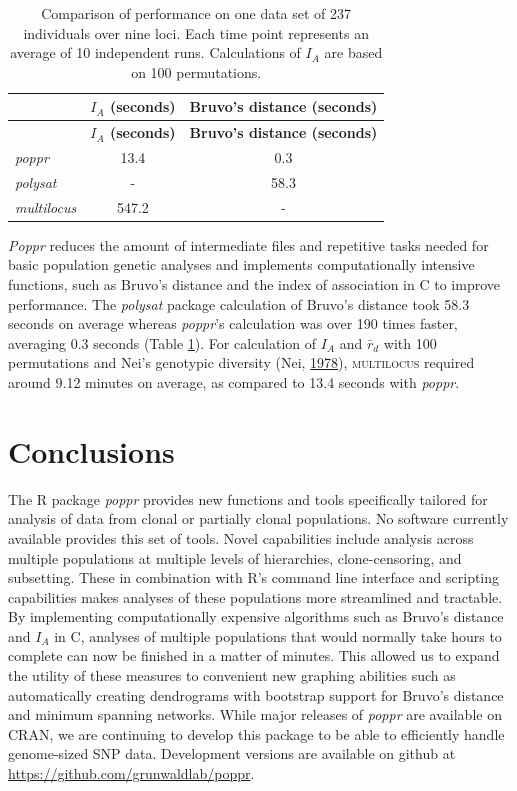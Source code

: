\documentclass[double,12pt]{beavtex}
\begin{document}
  \begin{longtable}[]{@{}lcc@{}}
  \caption{\label{tab:poppr6} Comparison of performance on one data set of 237
  individuals over nine loci. Each time point represents an average of 10
  independent runs. Calculations of \(I_A\) are based on 100
  permutations.}\tabularnewline
  \toprule
  & \textbf{\(I_A\) (seconds)} & \textbf{Bruvo's distance
  (seconds)}\tabularnewline
  \midrule
  \endfirsthead
  \toprule
  & \textbf{\(I_A\) (seconds)} & \textbf{Bruvo's distance
  (seconds)}\tabularnewline
  \midrule
  \endhead
  \emph{poppr} & 13.4 & 0.3\tabularnewline
  \emph{polysat} & - & 58.3\tabularnewline
  \emph{multilocus} & 547.2 & -\tabularnewline
  \bottomrule
  \end{longtable}
  
  \emph{Poppr} reduces the amount of intermediate files and repetitive
  tasks needed for basic population genetic analyses and implements
  computationally intensive functions, such as Bruvo's distance and the
  index of association in C to improve performance. The \emph{polysat}
  package calculation of Bruvo's distance took 58.3 seconds on average
  whereas \emph{poppr}'s calculation was over 190 times faster, averaging
  0.3 seconds (Table \ref{tab:poppr6}). For calculation of \(I_A\) and
  \(\bar{r}_d\) with 100 permutations and Nei's genotypic diversity (Nei,
  \protect\hyperlink{ref-Nei:1978}{1978}), \textsc{multilocus} required
  around 9.12 minutes on average, as compared to 13.4 seconds with
  \emph{poppr}.
  
  \section{Conclusions}\label{conclusions}
  
  The R package \emph{poppr} provides new functions and tools specifically
  tailored for analysis of data from clonal or partially clonal
  populations. No software currently available provides this set of tools.
  Novel capabilities include analysis across multiple populations at
  multiple levels of hierarchies, clone-censoring, and subsetting. These
  in combination with R's command line interface and scripting
  capabilities makes analyses of these populations more streamlined and
  tractable. By implementing computationally expensive algorithms such as
  Bruvo's distance and \(I_A\) in C, analyses of multiple populations that
  would normally take hours to complete can now be finished in a matter of
  minutes. This allowed us to expand the utility of these measures to
  convenient new graphing abilities such as automatically creating
  dendrograms with bootstrap support for Bruvo's distance and minimum
  spanning networks. While major releases of \emph{poppr} are available on
  CRAN, we are continuing to develop this package to be able to
  efficiently handle genome-sized SNP data. Development versions are
  available on github at \url{https://github.com/grunwaldlab/poppr}.
  
\end{document}
